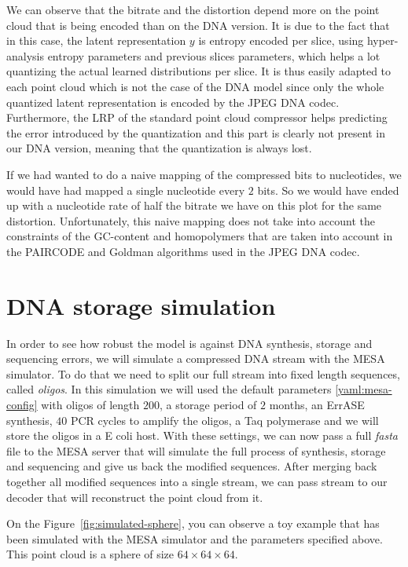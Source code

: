 We can observe that the bitrate and the distortion depend more on the point cloud that is being encoded than on the DNA version. It is due to the fact that in this case, the latent representation $y$ is entropy encoded per slice, using hyper-analysis entropy parameters and previous slices parameters, which helps a lot quantizing the actual learned distributions per slice. It is thus easily adapted to each point cloud which is not the case of the DNA model since only the whole quantized latent representation is encoded by the JPEG DNA codec. 
Furthermore, the LRP of the standard point cloud compressor helps predicting the error introduced by the quantization and this part is clearly not present in our DNA version, meaning that the quantization is always lost.

If we had wanted to do a naive mapping of the compressed bits to nucleotides, we would have had mapped a single nucleotide every $2$ bits. So we would have ended up with a nucleotide rate of half the bitrate we have on this plot for the same distortion. 
Unfortunately, this naive mapping does not take into account the constraints of the GC-content and homopolymers that are taken into account in the PAIRCODE and Goldman algorithms used in the JPEG DNA codec.

\section{DNA storage simulation}
\label{sec:simu}

In order to see how robust the model is against DNA synthesis, storage and sequencing errors, we will simulate a compressed DNA stream with the MESA simulator. To do that we need to split our full stream into fixed length sequences, called \textit{oligos}. In this simulation we will used the default parameters \ref{yaml:mesa-config} with oligos of length $200$, a storage period of $2$ months, an ErrASE synthesis, $40$ PCR cycles to amplify the oligos, a Taq polymerase and we will store the oligos in a E coli host. With these settings, we can now pass a full \textit{fasta} file to the MESA server that will simulate the full process of synthesis, storage and sequencing and give us back the modified sequences. After merging back together all modified sequences into a single stream, we can pass stream to our decoder that will reconstruct the point cloud from it. 

On the Figure~\ref{fig:simulated-sphere}, you can observe a toy example that has been simulated with the MESA simulator and the parameters specified above. This point cloud is a sphere of size $64 \times 64 \times 64$.

